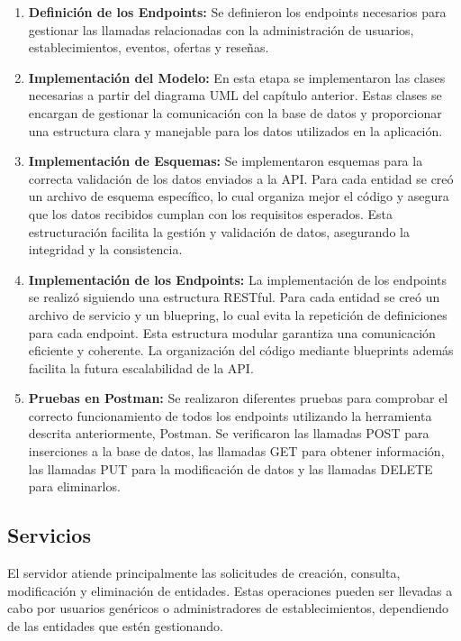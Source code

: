 \begin{enumerate}
    \item \textbf{Definición de los Endpoints: }Se definieron los endpoints necesarios para gestionar las llamadas relacionadas con la administración de usuarios, establecimientos, eventos, ofertas y reseñas.

    \item \textbf{Implementación del Modelo: } En esta etapa se implementaron las clases necesarias a partir del diagrama UML del capítulo anterior. Estas clases se encargan de gestionar la comunicación con la base de datos y proporcionar una estructura clara y manejable para los datos utilizados en la aplicación.

    \item \textbf{Implementación de Esquemas: } Se implementaron esquemas para la correcta validación de los datos enviados a la API. Para cada entidad se creó un archivo de esquema específico, lo cual organiza mejor el código y asegura que los datos recibidos cumplan con los requisitos esperados. Esta estructuración facilita la gestión y validación de datos, asegurando la integridad y la consistencia.

    \item \textbf{Implementación de los Endpoints: } La implementación de los endpoints se realizó siguiendo una estructura RESTful. Para cada entidad se creó un archivo de servicio y un bluepring, lo cual evita la repetición de definiciones para cada endpoint. Esta estructura modular garantiza una comunicación eficiente y coherente. La organización del código mediante blueprints además facilita la futura escalabilidad de la API.

    \item \textbf{Pruebas en Postman: } Se realizaron diferentes pruebas para comprobar el correcto funcionamiento de todos los endpoints utilizando la herramienta descrita anteriormente, Postman. Se verificaron las llamadas POST para inserciones a la base de datos, las llamadas GET para obtener información, las llamadas PUT para la modificación de datos y las llamadas DELETE para eliminarlos.
\end{enumerate}

\subsection{Servicios}

El servidor atiende principalmente las solicitudes de creación, consulta, modificación y eliminación de entidades. Estas operaciones pueden ser llevadas a cabo por usuarios genéricos o administradores de establecimientos, dependiendo de las entidades que estén gestionando.

